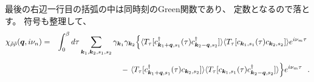 \documentclass[a4j]{jsarticle}
\begin{document}
%
%
%
%
最後の右辺一行目の括弧の中は同時刻のGreen関数であり、
定数となるので落とす。
符号も整理して、
%
%
%
%
\begin{eqnarray}
	\chi_{\tilde{\rho} \tilde{\rho}}(\bm{q},i \nu_{n})
	&=&
	\int^{\beta}_{0} d \tau
	\sum_{\bm{k}_{1} , \bm{k}_{2} , s_{1} ,s_{2} }
	\gamma_{\bm{k}_{1}}
	\gamma_{\bm{k}_{2}}
	\Big\{
	\langle T_{\tau} [
			c_{ \bm{k}_{1}+\bm{q} , s_{1} }^{\dagger} (\tau)
			c_{ \bm{k}_{2}-\bm{q} , s_{2} }^{\dagger}
		] \rangle
	\langle T_{\tau} [
			c_{ \bm{k}_{1} , s_{1} } (\tau)
			c_{ \bm{k}_{2} , s_{2} }
		] \rangle
	e^{i \nu_{m} \tau}
	\nonumber \ \\[2mm]
	&& \hspace{25mm} - \
	\langle T_{\tau} [
			c_{ \bm{k}_{1}+\bm{q} , s_{1} }^{\dagger} (\tau)
			c_{ \bm{k}_{2} , s_{2} }
		] \rangle
	\langle T_{\tau} [
			c_{ \bm{k}_{1} , s_{1} } (\tau)
			c_{ \bm{k}_{2}-\bm{q} , s_{2} }^{\dagger}
		] \rangle
	\Big\}
	e^{i \nu_{m} \tau}
	\ \ .
	\label{eqn:timeintegralbefore141125}
\end{eqnarray}
%
%
%
%
\end{document}
